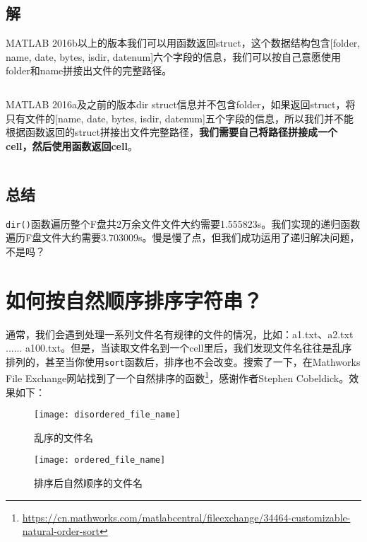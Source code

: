 \subsection*{解}

MATLAB 2016b以上的版本我们可以用函数返回struct，这个数据结构包含[folder, name, date, bytes, isdir, datenum]六个字段的信息，我们可以按自己意愿使用folder和name拼接出文件的完整路径。

\inputminted[firstline=1]{Matlab}{code/matlab/get_all_file_name_R2016b_newer.m}

MATLAB 2016a及之前的版本dir struct信息并不包含folder，如果返回struct，将只有文件的[name, date, bytes, isdir, datenum]五个字段的信息，所以我们并不能根据函数返回的struct拼接出文件完整路径，\textbf{我们需要自己将路径拼接成一个cell，然后使用函数返回cell}。

\inputminted{Matlab}{code/matlab/get_all_file_name_R2016a_older.m}

\subsection*{总结}
\texttt{dir()}函数遍历整个F盘共2万余文件文件大约需要1.555823s。我们实现的递归函数遍历F盘文件大约需要3.703009s。慢是慢了点，但我们成功运用了递归解决问题，不是吗？

\section{如何按自然顺序排序字符串？}

通常，我们会遇到处理一系列文件名有规律的文件的情况，比如：a1.txt、a2.txt ...... a100.txt。但是，当读取文件名到一个cell里后，我们发现文件名往往是乱序排列的，甚至当你使用\texttt{sort}函数后，排序也不会改变。搜索了一下，在Mathworks File Exchange网站找到了一个自然排序的函数\footnote{\url{https://cn.mathworks.com/matlabcentral/fileexchange/34464-customizable-natural-order-sort}}，感谢作者Stephen Cobeldick。效果如下：

\begin{figure}[h]
    \centering
    \begin{minipage}{0.45\textwidth}
        \centering
        \texttt{[image: disordered\_file\_name]}
        \caption{乱序的文件名}
    \end{minipage}
    \begin{minipage}{0.45\textwidth}
        \centering
        \texttt{[image: ordered\_file\_name]}
        \caption{排序后自然顺序的文件名}
    \end{minipage}
\end{figure}

